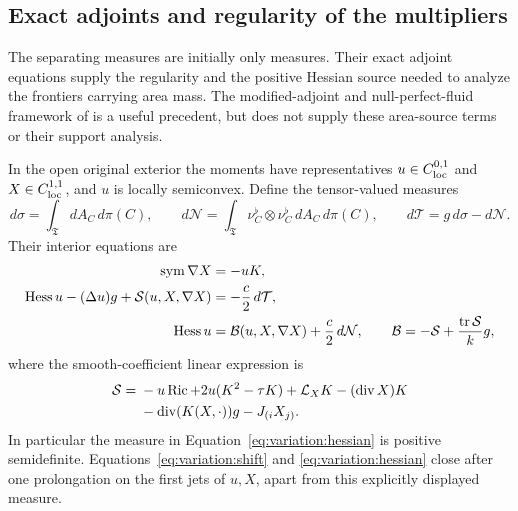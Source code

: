 
\subsection{Exact adjoints and regularity of the multipliers}

The separating measures are initially only measures. Their exact
adjoint equations supply the regularity and the positive Hessian
source needed to analyze the frontiers carrying area mass. The
modified-adjoint and null-perfect-fluid framework of
\cite[Section~6.1]{HuangLee2024Bartnik} is a useful precedent, but
does not supply these area-source terms or their support analysis.

\begin{lemma}\label{lem:variation:adjoints}
In the open original exterior the moments have representatives
$u\in C^{0,1}_{\rm loc}$ and $X\in C^{1,1}_{\rm loc}$, and $u$ is
locally semiconvex.  Define the tensor-valued measures
\[
 d\sigma=\int_{\mathfrak T}dA_C\,d\pi(C),\qquad
 d\mathcal N=\int_{\mathfrak T}\nu_C^\flat\otimes\nu_C^\flat\,dA_C\,d\pi(C),
 \qquad d\mathcal T=g\,d\sigma-d\mathcal N.
\]
Their interior equations are
\begin{align}
 \operatorname{sym}\nabla X&=-uK,\label{eq:variation:shift}\\
 \operatorname{Hess} u-(\Delta u)g+\mathcal S(u,X,\nabla X)
      &=-\frac c2\,d\mathcal T,\label{eq:variation:metric-adjoint}\\
 \operatorname{Hess} u&=\mathcal B(u,X,\nabla X)+\frac c2\,d\mathcal N,
 \qquad
 \mathcal B=-\mathcal S+\frac{\operatorname{tr}\mathcal S}{k}g,
 \label{eq:variation:hessian}
\end{align}
where the smooth-coefficient linear expression is
\begin{equation}\label{eq:variation:S}
 \begin{split}
 \mathcal S={}&-u\operatorname{Ric}+2u(K^2-\tau K)
       +\mathcal L_XK-(\operatorname{div} X)K\\
     &-\operatorname{div}(K(X,\cdot))g-J_{(i}X_{j)}.
 \end{split}
\end{equation}
In particular the measure in Equation~\eqref{eq:variation:hessian} is positive
semidefinite.  Equations~\eqref{eq:variation:shift} and
\eqref{eq:variation:hessian} close after one prolongation on the first
jets of $u,X$, apart from this explicitly displayed measure.
\end{lemma}

